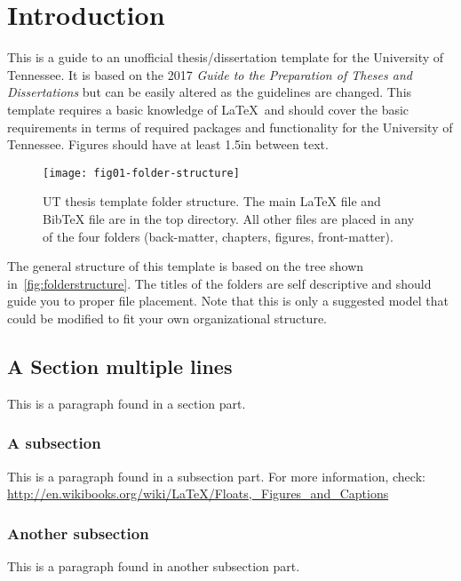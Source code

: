 \chapter{Introduction} \label{chapter1}

This is a guide to an unofficial thesis/dissertation template
for the University of Tennessee.
It is based on the 2017 \textit{Guide to the Preparation of Theses and Dissertations}
but can be easily altered as the guidelines are changed.
This template requires a basic knowledge of \LaTeX\ and should cover
the basic requirements in terms of required packages and functionality
for the University of Tennessee.
Figures should have at least 1.5in between text.

\begin{figure}[!htb]
    \Centering
    \texttt{[image: fig01-folder-structure]}
    \caption[UT thesis template folder structure]{UT thesis template folder structure.
        The main LaTeX file and BibTeX file are in the top directory.
        All other files are placed in any of the four folders
        (back-matter, chapters, figures, front-matter).}
    \label{fig:folderstructure}
\end{figure}

\tab The general structure of this template is based on the tree shown in~\autoref{fig:folderstructure}.
The titles of the folders are self descriptive
and should guide you to proper file placement.
Note that this is only a suggested model that could be
modified to fit your own organizational structure.

\section{A Section multiple lines} \label{asection}
This is a paragraph found in a section part.

\subsection{A subsection}
This is a paragraph found in a subsection part.
For more information, check:
\url{http://en.wikibooks.org/wiki/LaTeX/Floats,_Figures_and_Captions}

\subsection{Another subsection}
This is a paragraph found in another subsection part.


